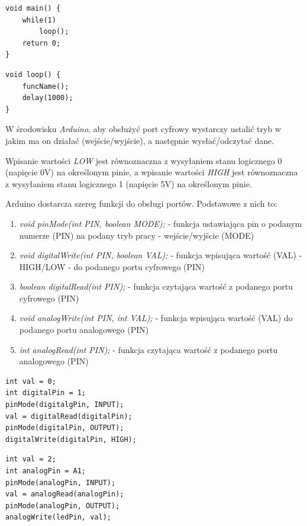\documentclass{xmgr}
\begin{document}
\begin{lstlisting}[label=bot-dirs-alg,caption=Odpowiednik wywołania pętli loop() w Arduino dla języka C/C++]
void main() {
	while(1)
		loop();
	return 0;
}
\end{lstlisting}

\begin{lstlisting}[label=bot-dirs-alg,caption=Odpytywanie funkcji w nieskończonej pętli w środowisku Arduino]
void loop() {
	funcName();
	delay(1000);
}
\end{lstlisting}

W środowisku \emph{Arduino}, aby obsłużyć port cyfrowy wystarczy ustalić tryb w jakim ma on działać (wejście/wyjście), a następnie wysłać/odczytać dane.

Wpisanie wartości \emph{LOW} jest równoznaczna z wysyłaniem stanu logicznego 0 (napięcie 0V) na określonym pinie, a wpisanie wartości \emph{HIGH} jest równoznaczna z wysyłaniem stanu logicznego 1 (napięcie 5V) na określonym pinie.

Arduino dostarcza szereg funkcji do obsługi portów. Podstawowe z nich to:

\begin{enumerate}
	\item \emph{void pinMode(int PIN, boolean MODE);} - funkcja ustawiająca pin o podanym numerze (PIN) na podany tryb pracy - wejście/wyjście (MODE)
	\item \emph{void digitalWrite(int PIN, boolean VAL);} - funkcja wpisująca wartość (VAL) - HIGH/LOW - do podanego portu cyfrowego (PIN)
	\item \emph{boolean digitalRead(int PIN);} - funkcja czytająca wartość z podanego portu cyfrowego (PIN)
	\item \emph{void analogWrite(int PIN, int VAL);} - funkcja wpisująca wartość (VAL) do podanego portu analogowego (PIN)
	\item \emph{int analogRead(int PIN);}  - funkcja czytająca wartość z podanego portu analogowego (PIN)
\end{enumerate}

\begin{lstlisting}[label=bot-dirs-alg,caption=Obsługa portu cyfrowego w środowisku Arduino]
int val = 0;
int digitalPin = 1;	
pinMode(digitalgPin, INPUT);
val = digitalRead(digitalPin);
pinMode(digitalPin, OUTPUT);
digitalWrite(digitalPin, HIGH);
\end{lstlisting}

\begin{lstlisting}[label=bot-dirs-alg,caption=Obsługa portu analogowego w środowisku Arduino]
int val = 2;
int analogPin = A1;	
pinMode(analogPin, INPUT);
val = analogRead(analogPin);
pinMode(analogPin, OUTPUT);
analogWrite(ledPin, val);
\end{lstlisting}
\end{document}
